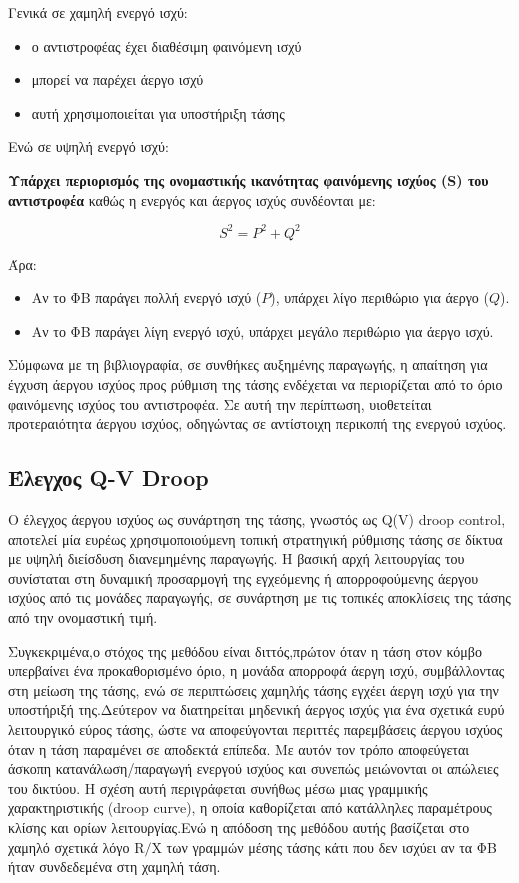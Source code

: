 {Γενικά σε χαμηλή ενεργό ισχύ:

\begin{itemize}
    \item ο αντιστροφέας έχει διαθέσιμη φαινόμενη ισχύ
    \item μπορεί να παρέχει άεργο ισχύ
    \item αυτή χρησιμοποιείται για υποστήριξη τάσης
\end{itemize}

Ενώ σε υψηλή ενεργό ισχύ:

\textbf{Υπάρχει περιορισμός της ονομαστικής ικανότητας φαινόμενης ισχύος \textlatin{(S)} του αντιστροφέα }
καθώς η ενεργός και άεργος ισχύς συνδέονται με:

\begin{equation}
S^2 = P^2 + Q^2
\end{equation}

Άρα:
\begin{itemize}
    \item Αν το ΦΒ παράγει πολλή ενεργό ισχύ ($P$), υπάρχει λίγο περιθώριο για άεργο ($Q$).
    \item Αν το ΦΒ παράγει λίγη ενεργό ισχύ, υπάρχει μεγάλο περιθώριο για άεργο ισχύ.
\end{itemize}
Σύμφωνα με τη βιβλιογραφία, σε συνθήκες αυξημένης παραγωγής, η απαίτηση για έγχυση άεργου ισχύος προς ρύθμιση της τάσης ενδέχεται να περιορίζεται από το όριο φαινόμενης ισχύος του αντιστροφέα. Σε αυτή την περίπτωση, υιοθετείται προτεραιότητα άεργου ισχύος, οδηγώντας σε αντίστοιχη περικοπή της ενεργού ισχύος. 


 
\subsection{Έλεγχος \textlatin{Q-V  Droop}}
 
Ο έλεγχος άεργου ισχύος ως συνάρτηση της τάσης, γνωστός ως \textlatin{Q(V) droop control}, αποτελεί μία ευρέως χρησιμοποιούμενη τοπική στρατηγική ρύθμισης τάσης σε δίκτυα με υψηλή διείσδυση διανεμημένης παραγωγής. Η βασική αρχή λειτουργίας του συνίσταται στη δυναμική προσαρμογή της εγχεόμενης ή απορροφούμενης άεργου ισχύος από τις μονάδες παραγωγής, σε συνάρτηση με τις τοπικές αποκλίσεις της τάσης από την ονομαστική τιμή.

Συγκεκριμένα,ο στόχος της μεθόδου είναι διττός,πρώτον όταν η τάση στον κόμβο υπερβαίνει ένα προκαθορισμένο όριο, η μονάδα απορροφά άεργη ισχύ, συμβάλλοντας στη μείωση της τάσης, ενώ σε περιπτώσεις χαμηλής τάσης εγχέει άεργη ισχύ για την υποστήριξή της.Δεύτερον να διατηρείται μηδενική άεργος ισχύς για ένα σχετικά ευρύ λειτουργικό εύρος τάσης, ώστε να αποφεύγονται περιττές παρεμβάσεις άεργου ισχύος όταν η τάση παραμένει σε αποδεκτά επίπεδα. Με αυτόν τον τρόπο αποφεύγεται άσκοπη κατανάλωση/παραγωγή ενεργού ισχύος και συνεπώς μειώνονται οι απώλειες του δικτύου. Η σχέση αυτή περιγράφεται συνήθως μέσω μιας γραμμικής χαρακτηριστικής (\textlatin{droop curve}), η οποία καθορίζεται από κατάλληλες παραμέτρους κλίσης και ορίων λειτουργίας.Ενώ η απόδοση της μεθόδου αυτής βασίζεται στο χαμηλό σχετικά λόγο $\mathrm{R/X}$ των γραμμών μέσης τάσης κάτι που δεν ισχύει αν τα ΦΒ ήταν συνδεδεμένα στη χαμηλή τάση.


}
